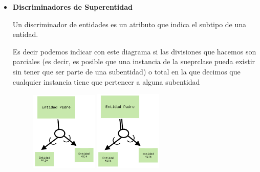 \documentclass[12pt, fleqn]{report}                             %
\begin{document}
\begin{itemize}
                \clearpage


                \item
                    \textbf{Discriminadores de Superentidad}

                    Un discriminador de entidades es un atributo que indica el subtipo
                    de una entidad.

                    Es decir podemos indicar con este diagrama si las divisiones que hacemos
                    son parciales (es decir, es posible que una instancia de la sueprclase
                    pueda existir sin tener que ser parte de una subentidad) o total
                    en la que decimos que cualquier instancia tiene que pertencer a alguna
                    subentidad

                    \begin{figure}[h]
                        \centering
                        \includegraphics[width=0.30\textwidth]{EERD0}
                        \includegraphics[width=0.30\textwidth]{EERD1}
                    \end{figure}

            \end{itemize}







        \clearpage
\end{document}

